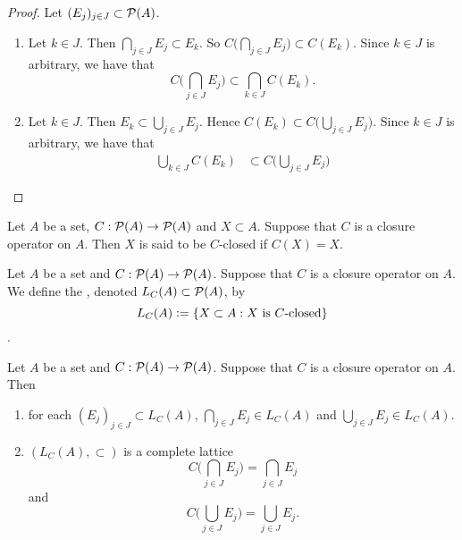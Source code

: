 \documentclass{book}
\begin{document}
	\begin{proof}
		Let $(E_j)_{j \in J} \subset \mathcal{P}(A)$. 
		\begin{enumerate}
			\item Let $k \in J$. Then $\bigcap\limits_{j \in J} E_j \subset E_k$.
			So $C \bigg( \bigcap\limits_{j \in J} E_j \bigg) \subset C(E_k)$. Since $k \in J$ is arbitrary, we have that 
			$$C \bigg( \bigcap\limits_{j \in J} E_j \bigg) \subset \bigcap\limits_{k \in J} C(E_k).$$ 
			\item Let $k \in J$. Then $E_k \subset \bigcup_{j \in J} E_j$. Hence $C(E_k) \subset C \bigg( \bigcup\limits_{j \in J} E_j \bigg)$. Since $k \in J$ is arbitrary, we have that 
			\begin{align*}
				\bigcup\limits_{k \in J} C(E_k) 
				& \subset C \bigg( \bigcup\limits_{j \in J} E_j \bigg)
			\end{align*}
			
		\end{enumerate}
	\end{proof}

	\begin{defn}
		Let $A$ be a set, $C: \mathcal{P}(A) \rightarrow \mathcal{P}(A)$ and $X \subset A$. Suppose that $C$ is a closure operator on $A$. Then $X$ is said to be $C$-closed if $C(X) = X$.  
	\end{defn}

	\begin{defn}
		Let $A$ be a set and $C: \mathcal{P}(A) \rightarrow \mathcal{P}(A)$. Suppose that $C$ is a closure operator on $A$. We define the , denoted $L_C(A) \subset \mathcal{P}(A)$, by 
		$$L_C(A) \vcentcolon= \{X \subset A: \text{$X$ is $C$-closed}\}$$. 
	\end{defn}


	\begin{ex}
		Let $A$ be a set and $C: \mathcal{P}(A) \rightarrow \mathcal{P}(A)$. Suppose that $C$ is a closure operator on $A$. Then
		\begin{enumerate}
			\item for each $(E_j)_{j \in J} \subset L_C(A)$, $\bigcap\limits_{j \in J} E_j \in L_C(A)$ and $\bigcup\limits_{j \in J} E_j \in L_C(A)$.
			\item $(L_C(A), \subset)$ is a complete lattice
			$$ C \bigg( \bigcap\limits_{j \in J} E_j \bigg) = \bigcap\limits_{j \in J} E_j $$ 
			and  
			$$ C \bigg(  \bigcup\limits_{j \in J} E_j \bigg) = \bigcup\limits_{j \in J} E_j.$$
		\end{enumerate}
	\end{ex}
\end{document}
